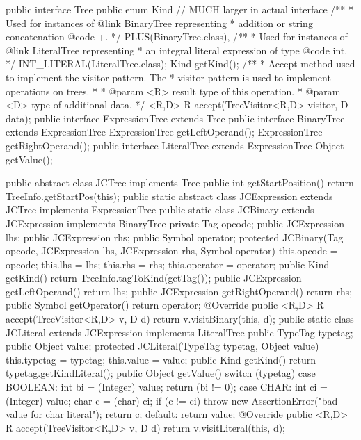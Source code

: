 \documentclass{article}
\newenvironment{jcode}{\footnotesize\verbatim}{\endverbatim\normalsize}
\begin{document}
\begin{jcode}
public interface Tree {
    public enum Kind {  // MUCH larger in actual interface
        /**
         * Used for instances of {@link BinaryTree} representing
         * addition or string concatenation {@code +}.
         */
        PLUS(BinaryTree.class),
        /**
         * Used for instances of {@link LiteralTree} representing
         * an integral literal expression of type {@code int}.
         */
        INT_LITERAL(LiteralTree.class);
    }
    Kind getKind();
    /**
     * Accept method used to implement the visitor pattern.  The
     * visitor pattern is used to implement operations on trees.
     *
     * @param <R> result type of this operation.
     * @param <D> type of additional data.
     */
    <R,D> R accept(TreeVisitor<R,D> visitor, D data);
}
public interface ExpressionTree extends Tree {}
public interface BinaryTree extends ExpressionTree {
    ExpressionTree getLeftOperand();
    ExpressionTree getRightOperand();
}
public interface LiteralTree extends ExpressionTree {
    Object getValue();
}

public abstract class JCTree implements Tree {
    public int getStartPosition() {
        return TreeInfo.getStartPos(this);
    }
    public static abstract class JCExpression
            extends JCTree implements ExpressionTree {}
    public static class JCBinary extends JCExpression implements BinaryTree {
        private Tag opcode;
        public JCExpression lhs;
        public JCExpression rhs;
        public Symbol operator;
        protected JCBinary(Tag opcode,
                         JCExpression lhs,
                         JCExpression rhs,
                         Symbol operator) {
            this.opcode = opcode;
            this.lhs = lhs;
            this.rhs = rhs;
            this.operator = operator;
        }
        public Kind getKind() { return TreeInfo.tagToKind(getTag()); }
        public JCExpression getLeftOperand() { return lhs; }
        public JCExpression getRightOperand() { return rhs; }
        public Symbol getOperator() { return operator; }
        @Override
        public <R,D> R accept(TreeVisitor<R,D> v, D d) {
            return v.visitBinary(this, d);
        }
    }
    public static class JCLiteral extends JCExpression implements LiteralTree {
        public TypeTag typetag;
        public Object value;
        protected JCLiteral(TypeTag typetag, Object value) {
            this.typetag = typetag;
            this.value = value;
        }
        public Kind getKind() {
            return typetag.getKindLiteral();
        }
        public Object getValue() {
            switch (typetag) {
                case BOOLEAN:
                    int bi = (Integer) value;
                    return (bi != 0);
                case CHAR:
                    int ci = (Integer) value;
                    char c = (char) ci;
                    if (c != ci)
                        throw new AssertionError("bad value for char literal");
                    return c;
                default:
                    return value;
            }
        }
        @Override
        public <R,D> R accept(TreeVisitor<R,D> v, D d) {
            return v.visitLiteral(this, d);
        }
    }
}
\end{jcode}
\end{document}
